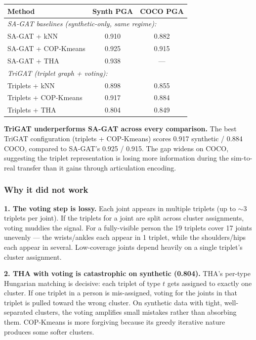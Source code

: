 \begin{tabular}{lcc}
\hline
\textbf{Method} & \textbf{Synth PGA} & \textbf{COCO PGA} \\
\hline
\multicolumn{3}{l}{\emph{SA-GAT baselines (synthetic-only, same regime):}} \\
SA-GAT + kNN & 0.910 & 0.882 \\
SA-GAT + COP-Kmeans & 0.925 & 0.915 \\
SA-GAT + THA & 0.938 & — \\
\hline
\multicolumn{3}{l}{\emph{TriGAT (triplet graph + voting):}} \\
Triplets + kNN & 0.898 & 0.855 \\
Triplets + COP-Kmeans & 0.917 & 0.884 \\
Triplets + THA & 0.804 & 0.849 \\
\hline
\end{tabular}

\vspace{0.5em}

\textbf{TriGAT underperforms SA-GAT across every comparison.} The best TriGAT configuration (triplets + COP-Kmeans) scores 0.917 synthetic / 0.884 COCO, compared to SA-GAT's 0.925 / 0.915. The gap widens on COCO, suggesting the triplet representation is losing more information during the sim-to-real transfer than it gains through articulation encoding.

\subsubsection{Why it did not work}

\textbf{1. The voting step is lossy.} Each joint appears in multiple triplets (up to $\sim 3$ triplets per joint). If the triplets for a joint are split across cluster assignments, voting muddies the signal. For a fully-visible person the 19 triplets cover 17 joints unevenly --- the wrists/ankles each appear in 1 triplet, while the shoulders/hips each appear in several. Low-coverage joints depend heavily on a single triplet's cluster assignment.

\textbf{2. THA with voting is catastrophic on synthetic (0.804).} THA's per-type Hungarian matching is decisive: each triplet of type $t$ gets assigned to exactly one cluster. If one triplet in a person is mis-assigned, voting for the joints in that triplet is pulled toward the wrong cluster. On synthetic data with tight, well-separated clusters, the voting amplifies small mistakes rather than absorbing them. COP-Kmeans is more forgiving because its greedy iterative nature produces some softer clusters.


